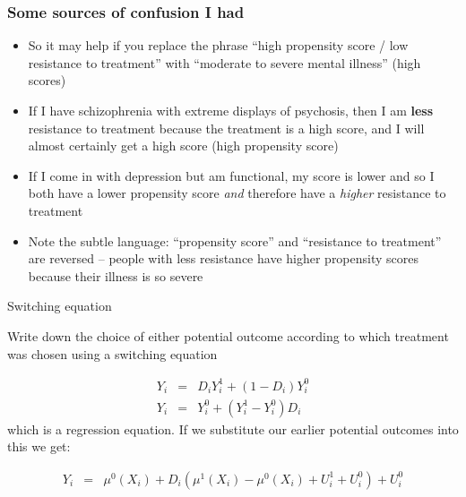 \documentclass{beamer}
\begin{document}
\begin{frame}
\frametitle{Some sources of confusion I had}

\begin{itemize}
\item So it may help if you replace the phrase ``high propensity score / low resistance to treatment'' with ``moderate to severe mental illness'' (high scores)
\item If I have schizophrenia with extreme displays of psychosis, then I am \textbf{less} resistance to treatment because the treatment is a high score, and I will almost certainly get a high score (high propensity score)
\item If I come in with depression but am functional, my score is lower and so I both have a lower propensity score \emph{and} therefore have a \emph{higher} resistance to treatment
\item Note the subtle language: ``propensity score'' and ``resistance to treatment'' are reversed -- people with less resistance have higher propensity scores because their illness is so severe
\end{itemize}

\end{frame}



\begin{frame}{Switching equation}

Write down the choice of either potential outcome according to which treatment was chosen using a switching equation

\begin{eqnarray*}
Y_i &=& D_iY_i^1 + (1-D_i)Y_i^0 \\
Y_i &=& Y_i^0 + (Y_i^1 - Y_i^0)D_i
\end{eqnarray*}which is a regression equation.  If we substitute our earlier potential outcomes into this we get:

\begin{eqnarray*}
Y_i &=& \mu^0(X_i) + D_i(\mu^1(X_i) - \mu^0(X_i) + U_i^1 + U_i^0) + U_i^0
\end{eqnarray*}

\end{frame}
\end{document}
